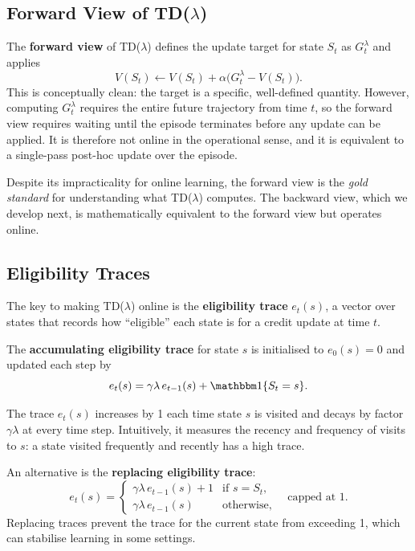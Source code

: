 \subsection{Forward View of TD($\lambda$)}
\label{subsec:forward-view}

The \textbf{forward view} of TD($\lambda$) defines the update target for state $S_t$ as $G_t^\lambda$ and applies
\[
V(S_t) \leftarrow V(S_t) + \alpha\bigl(G_t^\lambda - V(S_t)\bigr).
\]
This is conceptually clean: the target is a specific, well-defined quantity.  However, computing $G_t^\lambda$ requires the entire future trajectory from time $t$, so the forward view requires waiting until the episode terminates before any update can be applied.  It is therefore not online in the operational sense, and it is equivalent to a single-pass post-hoc update over the episode.

Despite its impracticality for online learning, the forward view is the \emph{gold standard} for understanding what TD($\lambda$) computes.  The backward view, which we develop next, is mathematically equivalent to the forward view but operates online.

\subsection{Eligibility Traces}
\label{subsec:eligibility-traces}

The key to making TD($\lambda$) online is the \textbf{eligibility trace} $e_t(s)$, a vector over states that records how ``eligible'' each state is for a credit update at time $t$.

\begin{definition}
\label{def:elig-trace}
The \textbf{accumulating eligibility trace} for state $s$ is initialised to $e_0(s)=0$ and updated each step by
\begin{equation}
\label{eq:elig-trace}
e_t(s) = \gamma\lambda\, e_{t-1}(s) + \ind\{S_t = s\}.
\end{equation}
\end{definition}

The trace $e_t(s)$ increases by 1 each time state $s$ is visited and decays by factor $\gamma\lambda$ at every time step.  Intuitively, it measures the recency and frequency of visits to $s$: a state visited frequently and recently has a high trace.

An alternative is the \textbf{replacing eligibility trace}:
\begin{equation}
\label{eq:elig-trace-replacing}
e_t(s) = \begin{cases} \gamma\lambda\, e_{t-1}(s) + 1 & \text{if } s = S_t,\\ \gamma\lambda\, e_{t-1}(s) & \text{otherwise,}\end{cases}
\quad\text{capped at 1.}
\end{equation}
Replacing traces prevent the trace for the current state from exceeding 1, which can stabilise learning in some settings.

